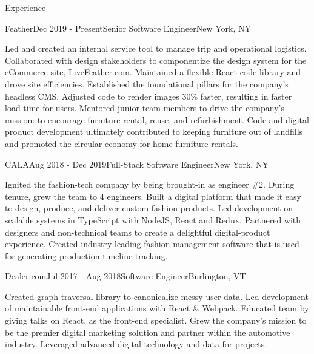 \documentclass{resume} %
\begin{document}
\begin{rSection}{Experience}

\begin{rSubsection}{Feather}{Dec 2019 - Present}{Senior Software Engineer}{New York, NY}

Led and created an internal service tool to manage trip and operational logistics.
Collaborated with design stakeholders to componentize the design system for the eCommerce
site, LiveFeather.com. Maintained a flexible React code library and drove site efficiencies.
Established the foundational pillars for the company’s headless CMS. Adjusted code to render
images 30\% faster, resulting in faster load-time for users. Mentored junior team members to
drive the company’s mission: to encourage furniture rental, reuse, and refurbishment. Code
and digital product development ultimately contributed to keeping furniture out of landfills
and promoted the circular economy for home furniture rentals.

\end{rSubsection}


\begin{rSubsection}{CALA}{Aug 2018 - Dec 2019}{Full-Stack Software Engineer}{New York, NY}

Ignited the fashion-tech company by being brought-in as engineer \#2. During tenure, grew
the team to 4 engineers. Built a digital platform that made it easy to design, produce,
and deliver custom fashion products. Led development on scalable systems in TypeScript with
NodeJS, React and Redux. Partnered with designers and non-technical teams to create a
delightful digital-product experience. Created industry leading fashion management software
that is used for generating production timeline tracking.

\end{rSubsection}


\begin{rSubsection}{Dealer.com}{Jul 2017 - Aug 2018}{Software Engineer}{Burlington, VT}

Created graph traversal library to canonicalize messy user data. Led development of
maintainable front-end applications with React \& Webpack. Educated team by giving talks
on React, as the front-end specialist. Grew the company’s mission to be the premier
digital marketing solution and partner within the automotive industry. Leveraged
advanced digital technology and data for projects.


\end{rSubsection}
\end{rSection}
\end{document}
